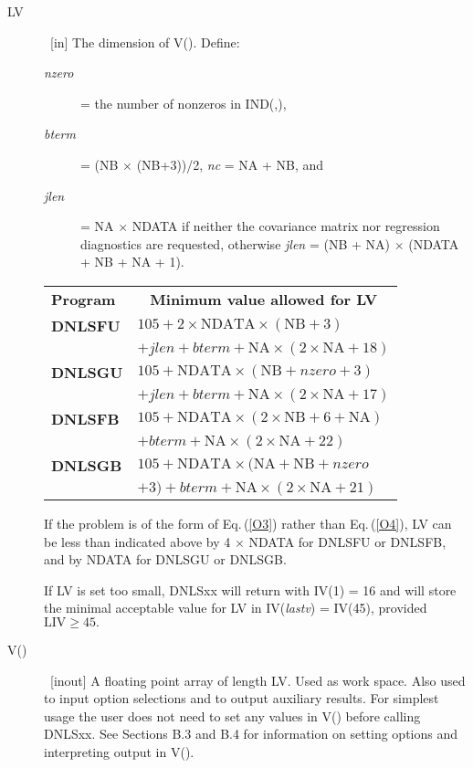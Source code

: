 \documentclass[twoside]{MATH77}
\begin{document}
\begin{description}
\item[LV]  \ [in] The dimension of V(). Define:\vspace{2pt}
\begin{description}
\item[\em nzero]= the number of nonzeros in IND(,),
\item[\em bterm]= (NB $\times $ (NB+3))/2, {\em nc} = NA + NB, and
\item[\em jlen]= NA $\times $ NDATA if neither the covariance
matrix nor regression diagnostics are requested,
otherwise {\em jlen} = (NB + NA) $\times$ (NDATA + NB + NA + 1).
\end{description}
\begin{tabular}{@{}l@{}l}
\bf Program & \multicolumn{1}{c}{\bf Minimum value allowed for LV}\\
\bf DNLSFU & \quad $105+2\times \text{NDATA}\times (\text{NB}+3)$\\
 & $+jlen +bterm+ \text{NA}\times(2\times \text{NA}+18)$\\
\bf DNLSGU & \quad $105+\text{NDATA}\times (\text{NB}+nzero+3)$\\
 & $+jlen+bterm+ \text{NA}\times(2\times \text{NA}+17)$\\
\bf DNLSFB & \quad $105+\text{NDATA}\times (2\times \text{NB}+6+\text{NA})$\\
 & $+bterm+\text{NA}\times (2\times \text{NA}+22)$\\
\bf DNLSGB & \quad $105+\text{NDATA}\times (\text{NA}+\text{NB}+nzero$\\
 & $+3)+ bterm+\text{NA}\times (2\times \text{NA}+21)$
\end{tabular}

If the problem is of the form of Eq.\,(\ref{O3}) rather than Eq.\,(\ref{O4}),
LV can be less than indicated above by 4 $\times $ NDATA for DNLSFU or
DNLSFB, and by NDATA for DNLSGU or DNLSGB.

If LV is set too small, DNLSxx will return with IV(1) = 16 and will store
the minimal acceptable value for LV in IV({\em lastv}) = IV(45),
provided $\text{LIV} \geq 45.$

\item[V()]  \ [inout] A floating point array of length LV. Used as work
space. Also used to input option selections and to output auxiliary results.
For simplest usage the user does not need to set any values in V() before
calling DNLSxx. See Sections B.3 and B.4 for information on setting options
and interpreting output in V().
\end{description}
\end{document}
